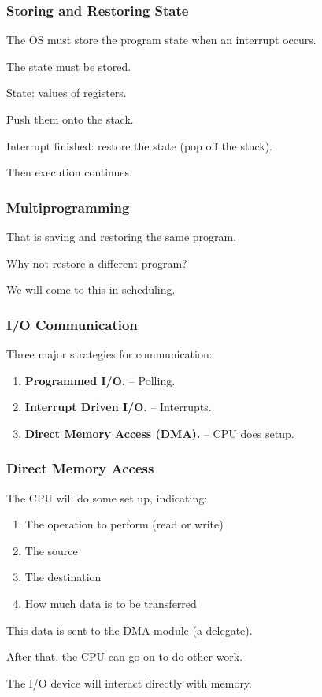 \begin{frame}
\frametitle{Storing and Restoring State}

The OS must store the program state when an interrupt occurs.

The state must be stored.

State: values of registers.

Push them onto the stack.

Interrupt finished: restore the state (pop off the stack).

Then execution continues.

\end{frame}

\begin{frame}
\frametitle{Multiprogramming}
That is saving and restoring the same program.

Why not restore a different program?

We will come to this in scheduling.


\end{frame}


\begin{frame}
\frametitle{I/O Communication}

Three major strategies for communication: 

\begin{enumerate}
	\item \textbf{Programmed I/O.} -- Polling.
	\item \textbf{Interrupt Driven I/O.} -- Interrupts.
	\item \textbf{Direct Memory Access (DMA).} -- CPU does setup.
\end{enumerate}

\end{frame}

\begin{frame}
\frametitle{Direct Memory Access}

The CPU will do some set up, indicating:

\begin{enumerate}
	\item The operation to perform (read or write)
	\item The source
	\item The destination
	\item How much data is to be transferred
\end{enumerate}

This data is sent to the DMA module (a delegate). 

After that, the CPU can go on to do other work.

The I/O device will interact directly with memory.


\end{frame}







